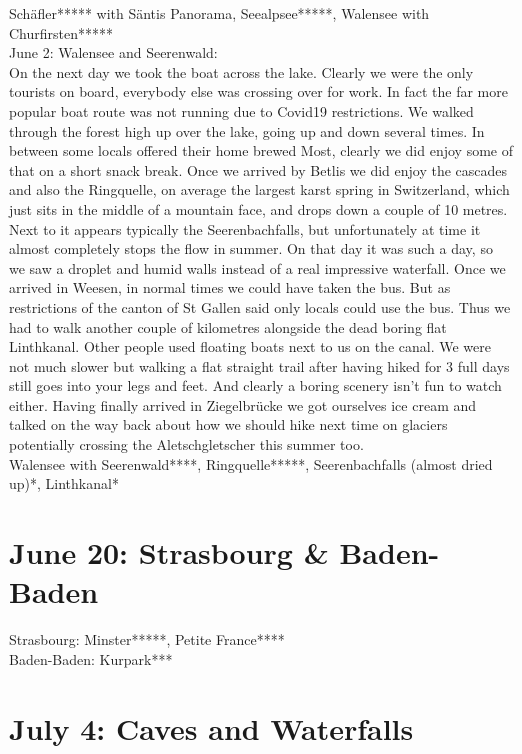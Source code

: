 Sch\"afler***** with S\"antis Panorama, Seealpsee*****, Walensee with Churfirsten*****\\

June 2: Walensee and Seerenwald:\\
On the next day we took the boat across the lake. Clearly we were the only tourists on board, everybody else was crossing over for work. In fact the far more popular boat route was not running due to Covid19 restrictions. We walked through the forest high up over the lake, going up and down several times. In between some locals offered their home brewed Most, clearly we did enjoy some of that on a short snack break. Once we arrived by Betlis we did enjoy the cascades and also the Ringquelle, on average the largest karst spring in Switzerland, which just sits in the middle of a mountain face, and drops down a couple of 10 metres. Next to it appears typically the Seerenbachfalls, but unfortunately at time it almost completely stops the flow in summer. On that day it was such a day, so we saw a droplet and humid walls instead of a real impressive waterfall. Once we arrived in Weesen, in normal times we could have taken the bus. But as restrictions of the canton of St Gallen said only locals could use the bus. Thus we had to walk another couple of kilometres alongside the dead boring flat Linthkanal. Other people used floating boats next to us on the canal. We were not much slower but walking a flat straight trail after having hiked for 3 full days still goes into your legs and feet. And clearly a boring scenery isn't fun to watch either. Having finally arrived in Ziegelbr\"ucke we got ourselves ice cream and talked on the way back about how we should hike next time on glaciers potentially crossing the Aletschgletscher this summer too.\\

Walensee with Seerenwald****, Ringquelle*****, Seerenbachfalls (almost dried up)*, Linthkanal*\\

 \section{June 20: Strasbourg \& Baden-Baden}
\label{2020:Strasbourg}

Strasbourg: Minster*****, Petite France****\\
Baden-Baden: Kurpark***\\

 \section{July 4: Caves and Waterfalls}
\label{2020:CavesWaterfalls}

